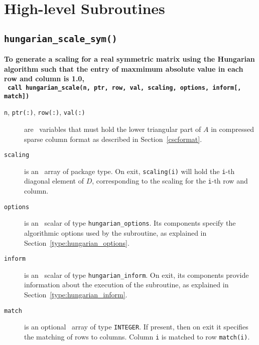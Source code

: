 \section{High-level Subroutines}


\subsection{\texttt{hungarian\_scale\_sym()}}

\textbf{\noindent
   To generate a scaling for a real symmetric matrix using the Hungarian algorithm such that the entry of maxmimum absolute value in each row and column is 1.0,
   \vspace*{0.1cm} \\
   \texttt{ \hspace*{0.2cm}
      call hungarian\_scale(n, ptr, row, val, scaling, options, inform[, match])
   }
   \vspace{0.3cm}
}

\begin{description}

\item[\texttt{n}, \texttt{ptr(:)}, \texttt{row(:)}, \texttt{val(:)}] are \intentin\ variables that must hold the lower triangular part of $A$ in compressed sparse column format as described in Section~\ref{cscformat}.

\item[\texttt{scaling}] is an \intentout\ array of package type. On exit,
\texttt{scaling(i)} will hold the \texttt{i}-th diagonal element of $D$,
corresponding to the scaling for the \texttt{i}-th row and column.

\item[\texttt{options}] is an \intentin\ scalar of type \texttt{hungarian\_options}. Its components specify the algorithmic options used by the subroutine, as explained in Section~\ref{type:hungarian_options}.

\item[\texttt{inform}] is an \intentout\ scalar of type \texttt{hungarian\_inform}. On exit, its components provide information about the execution of the subroutine, as explained in Section~\ref{type:hungarian_inform}.

\item[\texttt{match}] is an optional \intentout\ array of type {\tt INTEGER}.
If present, then on exit it specifies the matching of rows to columns.
Column \texttt{i} is matched to row \texttt{match(i)}.

\end{description}


